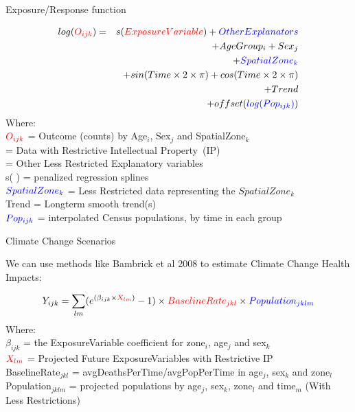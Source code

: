 \documentclass[final]{beamer}
\begin{document}
\begin{frame}{}
\begin{textblock}{17}
\begin{block}{Exposure/Response function}
\begin{tiny}
\begin{eqnarray*}
        log({\color{red} O_{ijk}})  & = & s({\color{red}ExposureVariable})  + {\color{blue} OtherExplanators}  \\
        & &   + AgeGroup_{i} + Sex_{j} \\
        & &   + {\color{blue} SpatialZone_{k}}  \\
        & &  + sin(Time \times 2 \times \pi) + cos(Time \times 2 \times \pi) \\
        & &  + Trend \\
        & &   + offset({\color{blue} log(Pop_{ijk})})\\
        \end{eqnarray*}
        \noindent Where:\\
        \indent ${\color{red}O_{ijk}}$ = Outcome (counts) by Age$_{i}$, Sex$_{j}$ and SpatialZone$_{k}$ \\
         = Data with {\color{red}Restrictive Intellectual Property~(IP)} \\
         = Other {\color{blue}Less Restricted}  Explanatory variables \\
        \indent s( ) = penalized regression splines \\
        \indent ${\color{blue} SpatialZone_{k}}$  = {\color{blue} Less Restricted} data representing the $SpatialZone_{k}$  \\
        \indent Trend = Longterm smooth trend(s) \\
        \indent ${\color{blue}Pop_{ijk}}$ = interpolated Census populations, by time in each group\\
\end{tiny}

\end{block}

\begin{block}{Climate Change Scenarios}
\begin{tiny}
We can use methods like Bambrick et al 2008 to estimate Climate Change Health Impacts:

$$Y_{ijk}=\sum_{lm}(e^{(\beta_{ijk} \times {\color{red} X_{lm}})} - 1) \times {\color{red}BaselineRate_{jkl}} \times {\color{blue} Population_{jklm}}$$
Where:\\
$\beta_{ijk}$ = the ExposureVariable coefficient for zone$_i$, age$_j$ and sex$_{k}$ \\
${\color{red}X_{lm}}$ = Projected Future ExposureVariables {\color{red} with Restrictive IP} \\
{\color{red}BaselineRate$_{jkl}$} = {\color{red}avgDeathsPerTime}/{\color{blue}avgPopPerTime} in age$_j$, sex$_k$ and zone$_l$ \\
{\color{blue}Population$_{jklm}$} = projected populations by age$_j$, sex$_k$, zone$_l$ and time$_m$ {\color{blue} (With Less Restrictions)}\\


\end{tiny}
\end{block}
\end{textblock}
\end{frame}
\end{document}
